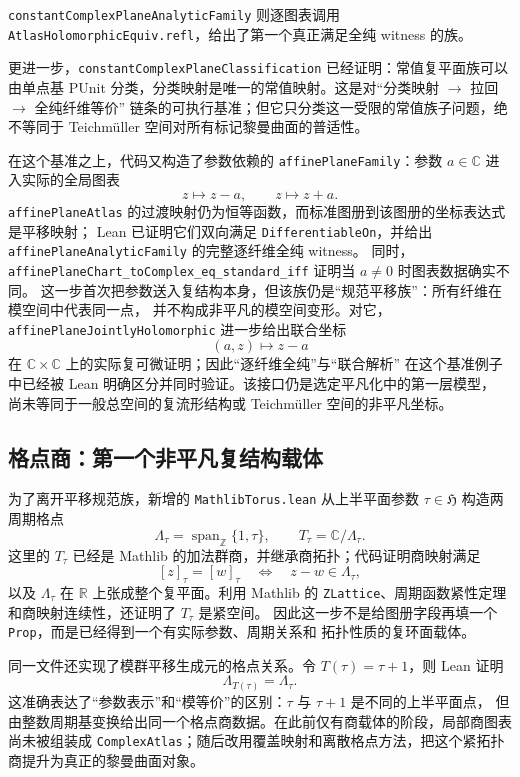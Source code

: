 \documentclass[UTF8,fontset=none,a4paper,11pt]{ctexart}
\begin{document}
\texttt{constantComplexPlaneAnalyticFamily} 则逐图表调用
\texttt{AtlasHolomorphicEquiv.refl}，给出了第一个真正满足全纯 witness 的族。

更进一步，\texttt{constantComplexPlaneClassification} 已经证明：常值复平面族可以由单点基
$\mathrm{PUnit}$ 分类，分类映射是唯一的常值映射。这是对“分类映射 $\to$ 拉回 $\to$ 全纯纤维等价”
链条的可执行基准；但它只分类这一受限的常值族子问题，绝不等同于 Teichmüller 空间对所有标记黎曼曲面的普适性。

在这个基准之上，代码又构造了参数依赖的
\texttt{affinePlaneFamily}：参数 $a\in\mathbb C$ 进入实际的全局图表
\[
  z\longmapsto z-a,\qquad z\longmapsto z+a.
\]
\texttt{affinePlaneAtlas} 的过渡映射仍为恒等函数，而标准图册到该图册的坐标表达式是平移映射；
Lean 已证明它们双向满足 \texttt{DifferentiableOn}，并给出
\texttt{affinePlaneAnalyticFamily} 的完整逐纤维全纯 witness。
同时，\texttt{affinePlaneChart\_toComplex\_eq\_standard\_iff} 证明当 $a\ne0$ 时图表数据确实不同。
这一步首次把参数送入复结构本身，但该族仍是“规范平移族”：所有纤维在模空间中代表同一点，
并不构成非平凡的模空间变形。对它，
\texttt{affinePlaneJointlyHolomorphic} 进一步给出联合坐标
\[
  (a,z)\longmapsto z-a
\]
在 $\mathbb C\times\mathbb C$ 上的实际复可微证明；因此“逐纤维全纯”与“联合解析”
在这个基准例子中已经被 Lean 明确区分并同时验证。该接口仍是选定平凡化中的第一层模型，
尚未等同于一般总空间的复流形结构或 Teichmüller 空间的非平凡坐标。

\clearpage
\subsection{格点商：第一个非平凡复结构载体}

为了离开平移规范族，新增的 \texttt{MathlibTorus.lean} 从上半平面参数
$\tau\in\mathfrak H$ 构造两周期格点
\[
  \Lambda_\tau
  =
  \operatorname{span}_{\mathbb Z}\{1,\tau\},
  \qquad
  T_\tau=\mathbb C/\Lambda_\tau.
\]
这里的 $T_\tau$ 已经是 Mathlib 的加法群商，并继承商拓扑；代码证明商映射满足
\[
  [z]_\tau=[w]_\tau
  \quad\Longleftrightarrow\quad
  z-w\in\Lambda_\tau,
\]
以及 $\Lambda_\tau$ 在 $\mathbb R$ 上张成整个复平面。利用 Mathlib 的
\texttt{ZLattice}、周期函数紧性定理和商映射连续性，还证明了 $T_\tau$ 是紧空间。
因此这一步不是给图册字段再填一个 \texttt{Prop}，而是已经得到一个有实际参数、周期关系和
拓扑性质的复环面载体。

同一文件还实现了模群平移生成元的格点关系。令
$T(\tau)=\tau+1$，则 Lean 证明
\[
  \Lambda_{T(\tau)}=\Lambda_\tau.
\]
这准确表达了“参数表示”和“模等价”的区别：$\tau$ 与 $\tau+1$ 是不同的上半平面点，
但由整数周期基变换给出同一个格点商数据。在此前仅有商载体的阶段，局部商图表尚未被组装成
\texttt{ComplexAtlas}；随后改用覆盖映射和离散格点方法，把这个紧拓扑商提升为真正的黎曼曲面对象。
\end{document}
